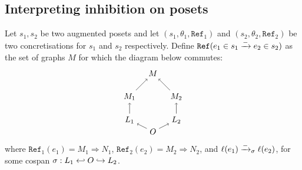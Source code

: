\subsection{Interpreting inhibition on posets}

\begin{definition}
  \label{def:ref_neg_infl}
  Let $s_1,s_2$ be two augmented posets and let $(s_1,\theta_1,\mathtt{Ref}_1)$ and $(s_2,\theta_2,\mathtt{Ref}_2)$ be two concretisations for $s_1$ and $s_2$ respectively.
  Define $\mathtt{Ref}(e_1\in s_1\mathrel{\xrightarrow{-}} e_2\in s_2)$ as the set of graphs $M$ for which the diagram below commutes:
  \[
  \begin{tikzpicture} %
    \node (o) at (0,-0.5) {\(O\)};
    \node (n) at (0,2) {\(M\)};
    \node (l1) at (-1,0) {\(L_1\)};
    \node (l2) at (1,0) {\(L_2\)};
    \node (n1) at (-1,1) {\(M_1\)};
    \node (n2) at (1,1) {\(M_2\)};
    \draw [->] (l1) -- (n1);
    \draw [->] (l2) -- (n2);
    \draw [->] (o) -- (l1);
    \draw [->] (o) -- (l2);
    \draw [->] (n1) -- (n);
    \draw [->] (n2) -- (n);
  \end{tikzpicture}
  \]
  where $\mathtt{Ref}_1(e_1) = M_1\Rightarrow N_1$, $\mathtt{Ref}_2(e_2) = M_2\Rightarrow N_2$, and $\ell(e_1)\mathrel{\xrightarrow{-}}_{\sigma}\ell(e_2)$, for some cospan $\sigma:L_1\hookleftarrow O\hookrightarrow L_2$.
\end{definition}
